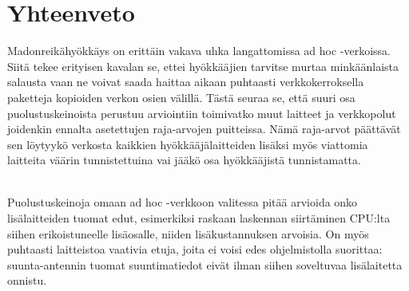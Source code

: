 \documentclass[finnish]{tktltiki2}
\theoremstyle{definition}
\theoremstyle{remark}
\begin{document}
\section{Yhteenveto}

Madonreikähyökkäys on erittäin vakava uhka langattomissa ad hoc -verkoissa. Siitä tekee erityisen kavalan se, ettei hyökkääjien tarvitse murtaa minkäänlaista salausta vaan ne voivat saada haittaa aikaan puhtaasti verkkokerroksella paketteja kopioiden verkon osien välillä. Tästä seuraa se, että suuri osa puolustuskeinoista perustuu arviointiin toimivatko muut laitteet ja verkkopolut joidenkin ennalta asetettujen raja-arvojen puitteissa. Nämä raja-arvot päättävät sen löytyykö verkosta kaikkien hyökkääjälaitteiden lisäksi myös viattomia laitteita väärin tunnistettuina vai jääkö osa hyökkääjistä tunnistamatta.

\noindent\\
Puolustuskeinoja omaan ad hoc -verkkoon valitessa pitää arvioida onko lisälaitteiden tuomat edut, esimerkiksi raskaan laskennan siirtäminen CPU:lta siihen erikoistuneelle lisäosalle, niiden lisäkustannuksen arvoisia. On myös puhtaasti laitteistoa vaativia etuja, joita ei voisi edes ohjelmistolla suorittaa: suunta-antennin tuomat suuntimatiedot eivät ilman siihen soveltuvaa lisälaitetta onnistu.




%
%
%
\newpage

%






% 
\end{document}
